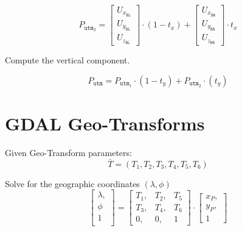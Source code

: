 \documentclass[10pt]{report}
\begin{document}
\begin{equation}
    P_{\texttt{utm}_2} = 
    \begin{bmatrix}
    U_{{x}_\texttt{BL}}\\
    U_{{y}_\texttt{BL}}\\
    U_{{z}_\texttt{BL}}
    \end{bmatrix} \cdot \left(1-t_x\right)
    + \begin{bmatrix}
        U_{{x}_\texttt{BR}}\\
        U_{{y}_\texttt{BR}}\\
        U_{{z}_\texttt{BR}}
        \end{bmatrix} \cdot t_x
\end{equation}

Compute the vertical component.

\begin{equation}
    P_{\texttt{utm}} = 
    P_{\texttt{utm}_1} \cdot \left(1-t_y\right) +
    P_{\texttt{utm}_2} \cdot \left( t_y \right)
\end{equation}

\chapter*{GDAL Geo-Transforms}

Given Geo-Transform parameters:
\begin{equation}
\bar{T} = \left( T_1, T_2, T_3, T_4, T_5, T_6 \right)
\end{equation}

Solve for the geographic coordinates $(\lambda, \phi)$
\begin{equation}
\begin{bmatrix}
\lambda,\\
\phi\\
1\\
\end{bmatrix} = 
\begin{bmatrix}
T_1, & T_2, & T_5\\
T_3, & T_4, & T_6\\
  0, &   0, &   1
\end{bmatrix} \cdot 
\begin{bmatrix}
x_P, \\
y_P, \\
1
\end{bmatrix}
\end{equation}
\end{document}
